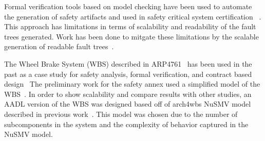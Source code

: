 Formal verification tools based on model checking have been used to automate the generation of safety artifacts and used in safety critical system certification~\cite{Bozzano:2011:SDP:1992983.1992988, symbAltaRica,10.1007/978-3-540-75596-8-13, DBLP:conf/tacas/BittnerBCCGGMMZ16, Bozzano:2010:DSA:1951720} . This approach has limitations in terms of scalability and readability of the fault trees generated. Work has been done to mitgate these limitations by the scalable generation of readable fault trees~\cite{10.1007/978-3-319-11936-6-7}. 

The Wheel Brake System (WBS) described in ARP4761~\cite{SAE:ARP4761} has been used in the past as a case study for safety analysis, formal verification, and contract based design~\cite{DBLP:conf/cav/BozzanoCPJKPRT15, 10.1007/978-3-319-11936-6-7, CAV2015:BoCiGrMa, Stewart17:IMBSA, propBasedProofSys, Joshi05:SafeComp, NasaRep:MBSA-Aug05} The preliminary work for the safety annex used a simplified model of the WBS~\cite{Stewart17:IMBSA}. In order to show scalability and compare results with other studies, an AADL version of the WBS was designed based off of arch4wbs NuSMV model described in previous work~\cite{DBLP:conf/cav/BozzanoCPJKPRT15}. This model was chosen due to the number of subcomponents in the system and the complexity of behavior captured in the NuSMV model. 

